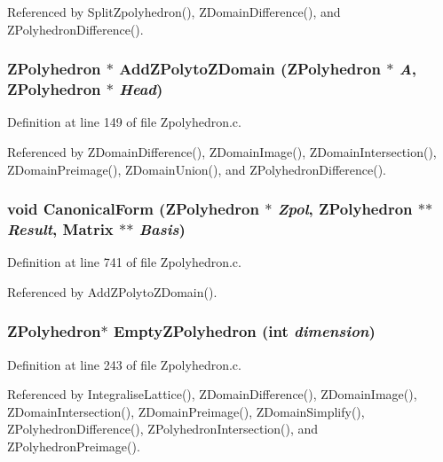 Referenced by Split\-Zpolyhedron(), ZDomain\-Difference(), and ZPolyhedron\-Difference().

\subsubsection{\setlength{\rightskip}{0pt plus 5cm}ZPolyhedron $\ast$ Add\-ZPolyto\-ZDomain (ZPolyhedron $\ast$ {\em A}, ZPolyhedron $\ast$ {\em Head})\hspace{0.3cm}{\tt  [static]}}\label{Zpolyhedron_8c_a7}




Definition at line 149 of file Zpolyhedron.c.

Referenced by ZDomain\-Difference(), ZDomain\-Image(), ZDomain\-Intersection(), ZDomain\-Preimage(), ZDomain\-Union(), and ZPolyhedron\-Difference().

\subsubsection{\setlength{\rightskip}{0pt plus 5cm}void Canonical\-Form (ZPolyhedron $\ast$ {\em Zpol}, ZPolyhedron $\ast$$\ast$ {\em Result}, Matrix $\ast$$\ast$ {\em Basis})}\label{Zpolyhedron_8c_a23}




Definition at line 741 of file Zpolyhedron.c.

Referenced by Add\-ZPolyto\-ZDomain().

\subsubsection{\setlength{\rightskip}{0pt plus 5cm}ZPolyhedron$\ast$ Empty\-ZPolyhedron (int {\em dimension})}\label{Zpolyhedron_8c_a14}




Definition at line 243 of file Zpolyhedron.c.

Referenced by Integralise\-Lattice(), ZDomain\-Difference(), ZDomain\-Image(), ZDomain\-Intersection(), ZDomain\-Preimage(), ZDomain\-Simplify(), ZPolyhedron\-Difference(), ZPolyhedron\-Intersection(), and ZPolyhedron\-Preimage().

